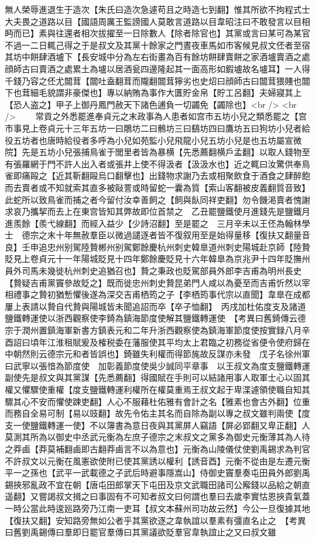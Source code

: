 無人榮辱進退生于造次【朱氏曰造次急遽苟且之時造七到翻】惟其所欲不拘程式士大夫畏之道路以目【國語周厲王監謗國人莫敢言道路以目韋昭注曰不敢發言以目相眄而已】素與往還者相次拔擢至一日除數人【除者除官也】其黨或言曰某可為某官不過一二日輒己得之于是叔文及其黨十餘家之門晝夜車馬如市客候見叔文伾者至宿其坊中餅肆酒壚下【長安城中分為左右街畫為百有餘坊餅肆賣餅之家酒壚賣酒之處顔師古曰賣酒之處累土為壚以居酒瓮四邊隆起其一面高形如鍜壚故名壚耳】一人得千錢乃容之伾尤闒茸【闒吐盍翻茸而隴翻闒茸獰劣也史炤曰顔師古曰闒茸猥賤也闒下也茸細毛貌謂非豪傑也】專以納賄為事作大匱貯金帛【貯工呂翻】夫婦寢其上【恐人盗之】甲子上御丹鳳門赦天下諸色逋負一切蠲免【蠲除也】<br />
<br />
　　常貢之外悉罷進奉貞元之末政事為人患者如宫市五坊小兒之類悉罷之【宫市事見上卷貞元十三年五坊一曰鵰坊二曰鶻坊三曰鷂坊四曰鷹坊五曰狗坊小兒者給役五坊者也唐時給役者多呼為小兒如苑監小兒飛龍小兒五坊小兒是也五坊屬宣微院】先是五坊小兒張捕鳥雀于閭里者皆為暴横【先悉薦翻横戶孟翻】以取人錢物至有張羅網于門不許人出入者或張井上使不得汲者【汲汲水也】近之輒曰汝驚供奉鳥雀即痛毆之【近其靳翻毆烏口翻擊也】出錢物求謝乃去或相聚飲食于酒食之肆醉飽而去賣者或不知就索其直多被敺詈或時留蛇一囊為質【索山客翻被皮義翻質音致】此蛇所以致鳥雀而捕之者今留付汝幸善飼之【飼與飤同祥吏翻】勿令饑渇賣者愧謝求哀乃攜挈而去上在東宫皆知其弊故即位首禁之　乙丑罷鹽鐵使月進錢先是鹽鐵月進羨餘【羨弋線翻】而經入益少【少詩沼翻】至是罷之　三月辛未以王伾為翰林學士　德宗之末十年無赦羣臣以微過譴逐者皆不復叙用至是始得量移【復扶又翻量音良】壬申追忠州别駕陸贄郴州别駕鄭餘慶杭州刺史韓臯道州刺史陽城赴京師【陸贄貶見上卷貞元十一年陽城貶見十四年鄭餘慶貶見十六年韓臯為京兆尹十四年貶撫州員外司馬未幾徙杭州刺史追猶召也】贄之秉政也貶駕部員外郎李吉甫為明州長史【贄疑吉甫黨竇參故貶之】既而徙忠州刺史贄昆弟門人咸以為憂至而吉甫忻然以宰相禮事之贄初猶慙懼後遂為深交吉甫栖筠之子【李栖筠事代宗以直聞】韋臯在成都屢上表請以贄自代贄與陽城皆未聞追詔而卒【卒子恤翻】　丙戌加杜佑度支及諸道鹽鐵轉運使以浙西觀察使李錡為鎮海節度使解其鹽鐵轉運使　【考異曰舊錡傳云德宗于潤州置鎮海軍新書方鎮表元和二年升浙西觀察使為鎮海軍節度使按實録八月辛酉詔曰頃年江淮租賦爰及榷税委在藩服使其平均太上君臨之初務從省便令使府歸在中朝然則云德宗元和者皆誤也】錡雖失利權而得節旄故反謀亦未發　戊子名徐州軍曰武寧以張愔為節度使　加彰義節度使吳少誠同平章事　以王叔文為度支鹽鐵轉運副使先是叔文與其黨謀【先悉薦翻】得國賦在手則可以結諸用事人取軍士心以固其權又懼驟使重權【度支鹽鐵轉運利權所在權莫重焉王叔文起于卑渫遽領使職自知其驟其心不安而懼使踈吏翻】人心不服藉杜佑雅有會計之名【雅素也會古外翻】位重而務自全易可制【易以豉翻】故先令佑主其名而自除為副以專之叔文雖判兩使【度支一使鹽鐵轉運一使】不以簿書為意日夜與其黨屏人竊語【屏必郢翻又卑正翻】人莫測其所為以御史中丞武元衡為左庶子德宗之末叔文之黨多為御史元衡薄其為人待之莽鹵【莽莫補翻鹵即古翻莽鹵言不以為意也】元衡為山陵儀仗使劉禹錫求為判官不許叔文以元衡在風憲欲使附已使其黨誘以權利【誘音酉】元衡不從由是左遷元衡平一之孫也【武平一武載德之子武后時避事隱嵩山】侍御史竇羣奏屯田員外郎劉禹錫挾邪亂政不宜在朝【唐屯田郎掌天下屯田及京文武職田諸司公廨錢以品給之朝直遥翻】又嘗謁叔文揖之曰事固有不可知者叔文曰何謂也羣曰去歲李實怙恩挾貴氣蓋一時公當此時逡廵路旁乃江南一吏耳【叔文本蘇州司功故云然】今公一旦復據其地【復扶又翻】安知路旁無如公者乎其黨欲逐之韋執誼以羣素有彊直名止之　【考異曰舊劉禹錫傳曰羣即日罷官羣傳曰其黨議欲貶羣官韋執誼止之又曰叔文雖